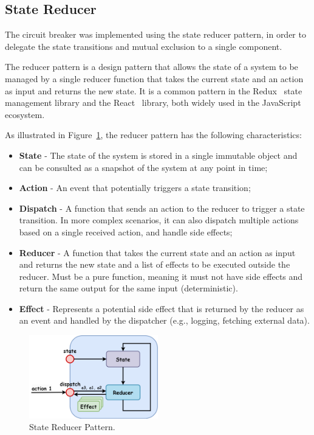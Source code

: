 \subsection{State Reducer}\label{subsec:cbreaker-state-reducer}

The circuit breaker was implemented using the state reducer pattern,
in order to delegate the state transitions and mutual exclusion to a single component.

The reducer pattern is a design pattern
that allows the state of a system
to be managed by a single reducer function
that takes the current state and an action as input and returns the new state.
It is a common pattern in the Redux~\cite{redux} state management library and the React~\cite{react-use-reducer} library,
both widely used in the JavaScript ecosystem.

As illustrated in Figure~\ref{fig:reducer-pattern}, the reducer pattern has the following characteristics:

\begin{itemize}
    \item \textbf{State} - The state of the system is stored in a single immutable object and can be consulted as a snapshot of the system at any point in time;
    \item \textbf{Action} - An event that potentially triggers a state transition;
    \item \textbf{Dispatch} - A function that sends an action to the reducer to trigger a state transition.
    In more complex scenarios, it can also dispatch multiple actions based on a single received action, and handle side effects;
    \item \textbf{Reducer} - A function that takes the current state and an action as input and returns the new state and a list of effects to be executed outside the reducer.
    Must be a pure function, meaning it must not have side effects and return the same output for the same input (deterministic).
    \item \textbf{Effect} -
    Represents a potential side effect that is returned by the reducer as an event and handled by the dispatcher (e.g., logging, fetching external data).
\end{itemize}

\begin{figure}[!htb]
    \centering
    \includegraphics[width=0.5\textwidth]{../figures/05_reducer-pattern}
    \caption{State Reducer Pattern.}
    \label{fig:reducer-pattern}
\end{figure}

